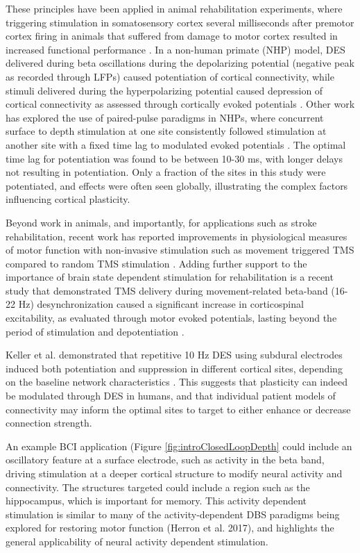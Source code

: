 These principles have been applied in animal rehabilitation experiments, where triggering stimulation in somatosensory cortex several milliseconds after premotor cortex firing in animals that suffered from damage to motor cortex resulted in increased functional performance \cite{Guggenmos2013a}. In a non-human primate (NHP) model, DES delivered during beta oscillations during the depolarizing potential (negative peak as recorded through LFPs) caused potentiation of cortical connectivity, while stimuli delivered during the hyperpolarizing potential caused depression of cortical connectivity as assessed through cortically evoked potentials \cite{Zanos2018}. Other work has explored the use of paired-pulse paradigms in NHPs, where concurrent surface to depth stimulation at one site consistently followed stimulation at another site with a fixed time lag to modulated evoked potentials \cite{Seeman2017}. The optimal time lag for potentiation was found to be between 10-30 ms, with longer delays not resulting in potentiation. Only a fraction of the sites in this study were potentiated, and effects were often seen globally, illustrating the complex factors influencing cortical plasticity. 

Beyond work in animals, and importantly, for applications such as stroke rehabilitation, recent work has reported improvements in physiological measures of motor function with non-invasive stimulation such as movement triggered TMS compared to random TMS stimulation \cite{Buetefisch2011}. Adding further support to the importance of brain state dependent stimulation for rehabilitation is a recent study that demonstrated TMS delivery during movement-related beta-band (16-22 Hz) desynchronization caused a significant increase in corticospinal excitability, as evaluated through motor evoked potentials, lasting beyond the period of stimulation and depotentiation \cite{Kraus2016}. 

Keller et al. demonstrated that repetitive 10 Hz DES using subdural electrodes induced both potentiation and suppression in different cortical sites, depending on the baseline network characteristics \cite{Keller2018}. This suggests that plasticity can indeed be modulated through DES in humans, and that individual patient models of connectivity may inform the optimal sites to target to either enhance or decrease connection strength. 

An example BCI application (Figure \ref{fig:introClosedLoopDepth} could include an oscillatory feature at a surface electrode, such as activity in the beta band, driving stimulation at a deeper cortical structure to modify neural activity and connectivity. The structures targeted could include a region such as the hippocampus, which is important for memory. This activity dependent stimulation is similar to many of the activity-dependent DBS paradigms being explored for restoring motor function (Herron et al. 2017), and highlights the general applicability of neural activity dependent stimulation. 

